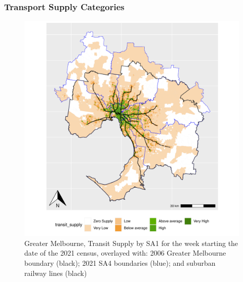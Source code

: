 \documentclass[preprint, 3p,
authoryear]{elsarticle} %
\begin{document}
\subsubsection{Transport Supply
Categories}\label{transport-supply-categories}

\begin{figure}
\centering
\includegraphics{ReynoldsCurrieQu2024_files/figure-latex/Greater_Melbourne_2021_SA1_plot-1.pdf}
\caption{Greater Melbourne, Transit Supply by SA1 for the week starting
the date of the 2021 census, overlayed with: 2006 Greater Melbourne
boundary (black); 2021 SA4 boundaries (blue); and suburban railway lines
(black)}
\end{figure}
\end{document}
